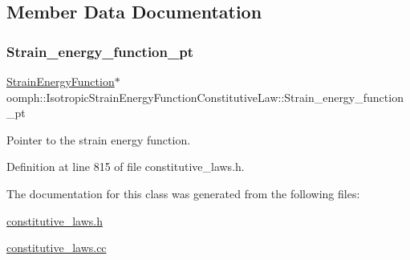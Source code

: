\subsection{Member Data Documentation}
\mbox{\label{classoomph_1_1IsotropicStrainEnergyFunctionConstitutiveLaw_a273d7ba7083654b4adfbe172d9839267}} 
\subsubsection{\texorpdfstring{Strain\+\_\+energy\+\_\+function\+\_\+pt}{Strain\_energy\_function\_pt}}
{\footnotesize\ttfamily \hyperlink{classoomph_1_1StrainEnergyFunction}{Strain\+Energy\+Function}$\ast$ oomph\+::\+Isotropic\+Strain\+Energy\+Function\+Constitutive\+Law\+::\+Strain\+\_\+energy\+\_\+function\+\_\+pt\hspace{0.3cm}{\ttfamily [private]}}



Pointer to the strain energy function. 



Definition at line 815 of file constitutive\+\_\+laws.\+h.



The documentation for this class was generated from the following files\+:\begin{DoxyCompactItemize}
\item 
\hyperlink{constitutive__laws_8h}{constitutive\+\_\+laws.\+h}\item 
\hyperlink{constitutive__laws_8cc}{constitutive\+\_\+laws.\+cc}\end{DoxyCompactItemize}
